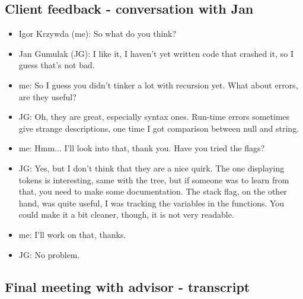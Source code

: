 \documentclass{article}
\begin{document}
\subsection{Client feedback - conversation with Jan}

    \begin{itemize}
        \item Igor Krzywda (me): So what do you think?
        \item Jan Gumulak (JG): I like it, I haven't yet written code that crashed
            it, so I guess that's not bad.
        \item me: So I guess you didn't tinker a lot with recursion yet. What
            about errors, are they useful?
        \item JG: Oh, they are great, especially syntax ones. Run-time errors
            sometimes give strange descriptions, one time I got comparison
            between null and string.
        \item me: Hmm... I'll look into that, thank you. Have you tried the flags?
        \item JG: Yes, but I don't think that they are a nice quirk. The one 
            displaying tokens is interesting, same with the tree, but if someone
            was to learn from that, you need to make some documentation. The stack
            flag, on the other hand, was quite useful, I was tracking the variables
            in the functions. You could make it a bit cleaner, though, it is not
            very readable.
        \item me: I'll work on that, thanks.
        \item JG: No problem.
    \end{itemize}
   
\subsection{Final meeting with advisor - transcript}
\end{document}

